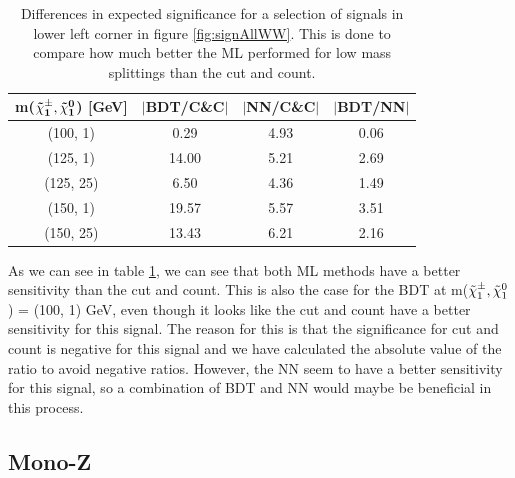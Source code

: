 \begin{table}[H]
    \centering
    \begin{tabular}{c c c c}
    \toprule
    \textbf{m($\mathbf{\Tilde{\chi}_1^\pm, \Tilde{\chi}_1^0}$) [GeV]} & \textbf{$|$BDT/C\&C$|$} & \textbf{$|$NN/C\&C$|$} &\textbf{$|$BDT/NN$|$}\\
    \midrule
    \midrule
        (100, 1)    & 0.29      & 4.93      & 0.06  \\
        (125, 1)    & 14.00     & 5.21      & 2.69  \\
        (125, 25)   & 6.50      & 4.36      & 1.49  \\  
        (150, 1)    & 19.57     & 5.57      & 3.51  \\
        (150, 25)   & 13.43     & 6.21      & 2.16  \\
    \bottomrule
    \end{tabular}
    \caption{Differences in expected significance for a selection of signals in lower left corner in figure \ref{fig:signAllWW}. This is done to compare how much better the ML performed for low mass splittings than the cut and count.}
    \label{tab:diffWW}
\end{table}


As we can see in table \ref{tab:diffWW}, we can see that both ML methods have a better sensitivity than the cut and count. This is also the case for the BDT at m($\Tilde{\chi}_1^\pm, \Tilde{\chi}_1^0$) = (100, 1) GeV, even though it looks like the cut and count have a better sensitivity for this signal. The reason for this is that the significance for cut and count is negative for this signal and we have calculated the absolute value of the ratio to avoid negative ratios. However, the NN seem to have a better sensitivity for this signal, so a combination of BDT and NN would maybe be beneficial in this process. 



























\subsection{Mono-Z}
\label{sec:resMono-Z}

